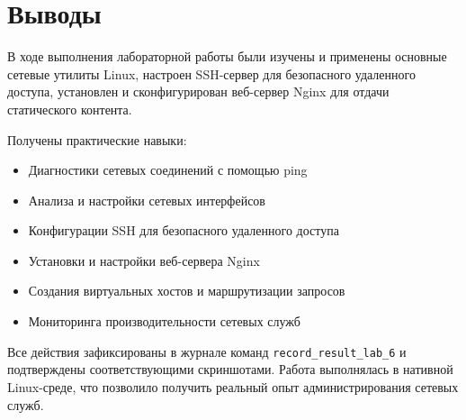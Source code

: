 \section{Выводы}
В ходе выполнения лабораторной работы были изучены и применены основные сетевые утилиты Linux, настроен SSH-сервер для безопасного удаленного доступа, установлен и сконфигурирован веб-сервер Nginx для отдачи статического контента. 

Получены практические навыки:
\begin{itemize}
    \item Диагностики сетевых соединений с помощью ping
    \item Анализа и настройки сетевых интерфейсов
    \item Конфигурации SSH для безопасного удаленного доступа
    \item Установки и настройки веб-сервера Nginx
    \item Создания виртуальных хостов и маршрутизации запросов
    \item Мониторинга производительности сетевых служб
\end{itemize}

Все действия зафиксированы в журнале команд \texttt{record\_result\_lab\_6} и подтверждены соответствующими скриншотами. Работа выполнялась в нативной Linux-среде, что позволило получить реальный опыт администрирования сетевых служб.
